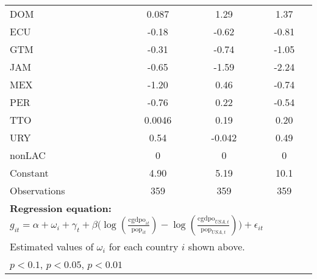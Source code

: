 \begin{sidewaystable}[htbp]
\begin{tabular}{l*{3}{c}}
DOM             &    0.087         &     1.29\sym{***}&     1.37\sym{***}\\
ECU             &    -0.18         &    -0.62\sym{***}&    -0.81\sym{***}\\
GTM             &    -0.31\sym{*}  &    -0.74\sym{***}&    -1.05\sym{***}\\
JAM             &    -0.65\sym{***}&    -1.59\sym{***}&    -2.24\sym{***}\\
MEX             &    -1.20\sym{***}&     0.46\sym{**} &    -0.74\sym{***}\\
PER             &    -0.76\sym{***}&     0.22         &    -0.54\sym{*}  \\
TTO             &   0.0046         &     0.19         &     0.20         \\
URY             &     0.54\sym{***}&   -0.042         &     0.49\sym{**} \\
nonLAC          &        0         &        0         &        0         \\
Constant        &     4.90\sym{*}  &     5.19         &     10.1\sym{**} \\
\midrule
Observations    &      359         &      359         &      359         \\
\bottomrule
\multicolumn{4}{l}{\footnotesize \textbf{Regression equation:} \(g_{it} = \alpha  + \omega_i + \gamma_t + \beta \big(\log (\frac{\textrm{cgdpo}_{it}}{\textrm{pop}_{it}} ) - \log (\frac{\textrm{cgdpo}_{USA,t}}{\textrm{pop}_{USA,t}}  ) \big) + \epsilon_{it}\)}\\
\multicolumn{4}{l}{\footnotesize Estimated values of \(\omega_i\) for each country \(i\) shown above.}\\
\multicolumn{4}{l}{\footnotesize \sym{*} \(p<0.1\), \sym{**} \(p<0.05\), \sym{***} \(p<0.01\)}\\
\end{tabular}
\end{sidewaystable}
